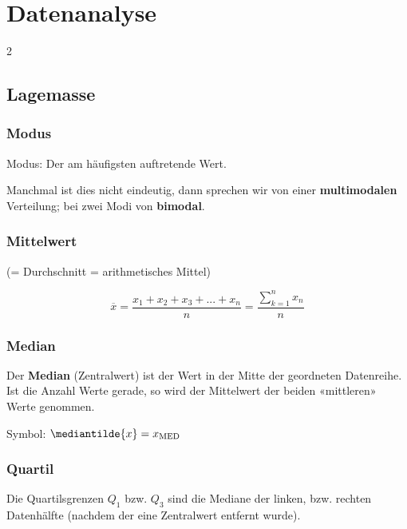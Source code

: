 \section*{Datenanalyse}

\MITSKALENTYPEN{\hrulefill}

\begin{multicols}{2}

\subsection*{Lagemasse}


\subsubsection*{Modus}
Modus: Der am häufigsten auftretende Wert.

Manchmal ist dies nicht eindeutig, dann sprechen wir von einer
\textbf{multimodalen} Verteilung; bei zwei Modi von \textbf{bimodal}.


\subsubsection*{Mittelwert}
(= Durchschnitt = arithmetisches Mittel)

$$\overline{x} = \frac{x_1 + x_2 + x_3 + ... +
x_n}{n}=  \frac{\sum\limits_{k=1}^nx_n}n$$

\subsubsection*{Median}


Der \textbf{Median} (Zentralwert) ist der Wert in der Mitte der geordneten Datenreihe. Ist
die Anzahl Werte gerade, so wird der Mittelwert der beiden
«mittleren» Werte genommen.

Symbol: $\mediantilde{x} = x_{\textrm{MED}}$


\subsubsection*{Quartil}

Die Quartilsgrenzen $Q_1$ bzw. $Q_3$ sind die Mediane der linken,
bzw. rechten Datenhälfte (nachdem der eine Zentralwert entfernt
wurde).


\end{multicols}
